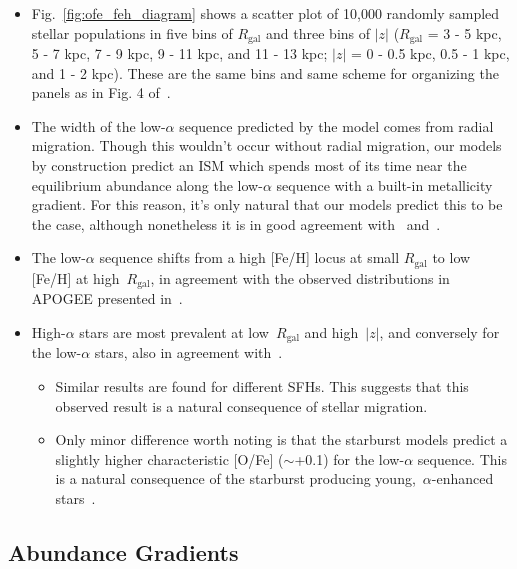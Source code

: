 \documentclass[fleqn, usenatbib]{mnras}
\begin{document}
\begin{itemize} 
	\item Fig.~\ref{fig:ofe_feh_diagram} shows a scatter plot of 10,000 
	randomly sampled stellar populations in five bins of $R_\text{gal}$ and 
	three bins of $\left|z\right|$ ($R_\text{gal}$ = 3 - 5 kpc, 5 - 7 kpc, 
	7 - 9 kpc, 9 - 11 kpc, and 11 - 13 kpc; $\left|z\right|$ = 0 - 0.5 kpc, 
	0.5 - 1 kpc, and 1 - 2 kpc). These are the same bins and same scheme for 
	organizing the panels as in Fig. 4 of~\citet{Hayden2015}. 

	\item The width of the low-$\alpha$ sequence predicted by the model comes 
	from radial migration. Though this wouldn't occur without radial migration, 
	our models by construction predict an ISM which spends most of its time 
	near the equilibrium abundance along the low-$\alpha$ sequence with a 
	built-in metallicity gradient. For this reason, it's only natural that our 
	models predict this to be the case, although nonetheless it is in good 
	agreement with~\citet{Schoenrich2009} and~\citet{Nidever2014}. 

	\item The low-$\alpha$ sequence shifts from a high [Fe/H] locus at small 
	$R_\text{gal}$ to low [Fe/H] at high~$R_\text{gal}$, in agreement with the 
	observed distributions in APOGEE presented in~\citet{Hayden2015}. 

	\item High-$\alpha$ stars are most prevalent at low~$R_\text{gal}$ and 
	high~$\left|z\right|$, and conversely for the low-$\alpha$ stars, also 
	in agreement with~\citet{Hayden2015}. 
	\begin{itemize} 
		\item Similar results are found for different SFHs. This suggests that 
		this observed result is a natural consequence of stellar migration. 

		\item Only minor difference worth noting is that the starburst models 
		predict a slightly higher characteristic [O/Fe] ($\sim$+0.1) for the 
		low-$\alpha$ sequence. This is a natural consequence of the starburst 
		producing young,~$\alpha$-enhanced stars~\citep{Johnson2020}. 
	\end{itemize} 
\end{itemize} 

\subsection{Abundance Gradients} 
\label{sec:comp_obs:metallicity_gradient} 
\end{document}
